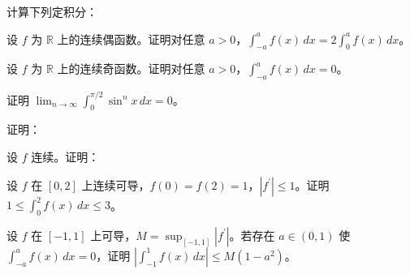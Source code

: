 \newpage
\noindent\begin{minipage}{\textwidth}
计算下列定积分：
\end{minipage}\par\vfill
\noindent\begin{minipage}{\textwidth}
设 $f$ 为 $\mathbb R$ 上的连续偶函数。证明对任意 $a>0$，$\int_{-a}^a f(x)\,dx=2\int_0^a f(x)\,dx$。
\end{minipage}\par\vfill
\noindent\begin{minipage}{\textwidth}
设 $f$ 为 $\mathbb R$ 上的连续奇函数。证明对任意 $a>0$，$\int_{-a}^a f(x)\,dx=0$。
\end{minipage}\par\vfill
\newpage
\noindent\begin{minipage}{\textwidth}
证明 $\lim_{n\to\infty}\int_0^{\pi/2}\sin^n x\,dx=0$。
\end{minipage}\par\vfill
\noindent\begin{minipage}{\textwidth}
证明：
\end{minipage}\par\vfill
\noindent\begin{minipage}{\textwidth}
设 $f$ 连续。证明：
\end{minipage}\par\vfill
\newpage
\noindent\begin{minipage}{\textwidth}
设 $f$ 在 $[0,2]$ 上连续可导，$f(0)=f(2)=1$，$|f^{\prime}|\le1$。证明 $1\le\int_0^2f(x)\,dx\le3$。
\end{minipage}\par\vfill
\noindent\begin{minipage}{\textwidth}
设 $f$ 在 $[-1,1]$ 上可导，$M=\sup_{[-1,1]}|f^{\prime}|$。若存在 $a\in(0,1)$ 使 $\int_{-a}^a f(x)\,dx=0$，证明 $|\int_{-1}^1f(x)\,dx|\le M(1-a^2)$。
\end{minipage}\par\vfill
